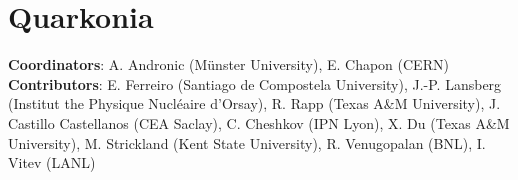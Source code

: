 \documentclass[../report.tex]{subfiles}
\begin{document}
\section{Quarkonia}

\label{sec:quarkonia}

\textbf{Coordinators}: A. Andronic (M\"{u}nster University), E. Chapon (CERN)
\linebreak
\textbf{Contributors}: 
E. Ferreiro (Santiago de Compostela University), J.-P. Lansberg (Institut the Physique Nucl\'{e}aire d'Orsay), R. Rapp (Texas A\&M University),
J. Castillo Castellanos (CEA Saclay),
C. Cheshkov (IPN Lyon),
X. Du (Texas A\&M University),
M. Strickland (Kent State University), R. Venugopalan (BNL), I. Vitev (LANL)


\end{document}
